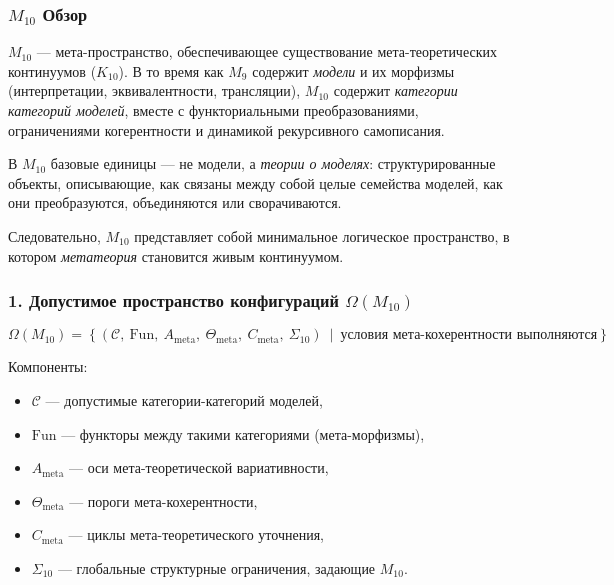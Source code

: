 

\subsubsection{$M_{10}$ Обзор}
\label{sec:m10-overview}

$M_{10}$ — мета-пространство, обеспечивающее существование
мета-теоретических континуумов ($K_{10}$).
В то время как $M_9$ содержит \emph{модели} и их морфизмы
(интерпретации, эквивалентности, трансляции),
$M_{10}$ содержит \emph{категории категорий моделей},
вместе с функториальными преобразованиями,
ограничениями когерентности и динамикой рекурсивного самописания.

В $M_{10}$ базовые единицы — не модели, а \emph{теории о моделях}:
структурированные объекты, описывающие, как связаны между собой целые семейства моделей,
как они преобразуются, объединяются или сворачиваются.

Следовательно, $M_{10}$ представляет собой минимальное логическое пространство, в котором
\emph{метатеория} становится живым континуумом.

\subsubsection*{1. Допустимое пространство конфигураций \texorpdfstring{$\Omega(M_{10})$}{\Omega(M_{10})}}

\[
\Omega(M_{10}) =
\left\{
(\mathcal{C},\ \mathrm{Fun},\ A_{\mathrm{meta}},\
\Theta_{\mathrm{meta}},\ C_{\mathrm{meta}},\ \Sigma_{10})
\ \middle|\
\text{условия мета-кохерентности выполняются}
\right\}.
\]

Компоненты:

\begin{itemize}
    \item $\mathcal{C}$ — допустимые категории-категорий моделей,
    \item $\mathrm{Fun}$ — функторы между такими категориями (мета-морфизмы),
    \item $A_{\mathrm{meta}}$ — оси мета-теоретической вариативности,
    \item $\Theta_{\mathrm{meta}}$ — пороги мета-кохерентности,
    \item $C_{\mathrm{meta}}$ — циклы мета-теоретического уточнения,
    \item $\Sigma_{10}$ — глобальные структурные ограничения, задающие $M_{10}$.
\end{itemize}

